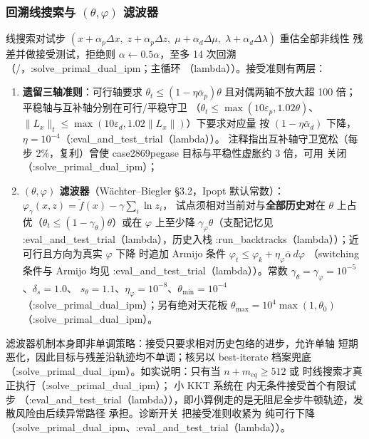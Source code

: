 \subsubsection*{回溯线搜索与 $(\theta,\varphi)$ 滤波器}
线搜索对试步 $(x+\alpha_p\Delta x,\;z+\alpha_p\Delta z,\;
\mu+\alpha_d\Delta\mu,\;\lambda+\alpha_d\Delta\lambda)$ 重估全部非线性
残差并做接受测试，拒绝则 $\alpha\leftarrow0.5\alpha$，至多 14 次回溯
（/，:solve\_primal\_dual\_ipm；主循环
（lambda））。接受准则有两层：
\begin{enumerate}
  \item \textbf{遗留三轴准则}：可行轴要求
        $\theta_t\le(1-\eta\bar\alpha_p)\theta$ 且对偶两轴不放大超 100 倍；
        平稳轴与互补轴分别在可行/平稳守卫
        （$\theta_t\le\max(10\varepsilon_p,1.02\theta)$、
        $\|L_x\|_t\le\max(10\varepsilon_d,1.02\|L_x\|)$）下要求对应量
        按 $(1-\eta\bar\alpha_d)$ 下降，$\eta=10^{-4}$（:eval\_and\_test\_trial（lambda））。
        注释指出互补轴守卫宽松（每步 2\%，复利）曾使 case2869pegase
        目标与平稳性虚胀约 3 倍，可用 
        关闭（:solve\_primal\_dual\_ipm）；
  \item \textbf{$(\theta,\varphi)$ 滤波器}（Wächter--Biegler §3.2，Ipopt
        默认常数）：$\varphi_\gamma(x,z)=\tilde f(x)-\gamma\sum_i\ln z_i$，
        试点须相对当前对与\textbf{全部历史对}在
        $\theta$ 上占优（$\theta_t\le(1-\gamma_\theta)\theta$）或在
        $\varphi$ 上至少降 $\gamma_\varphi\theta$（支配记忆见
        :eval\_and\_test\_trial（lambda），历史入栈 :run\_backtracks（lambda））；近可行且方向为真实 $\varphi$ 下降
        时追加 Armijo 条件
        $\varphi_t\le\varphi_k+\eta_\varphi\bar\alpha\, d\varphi$
        （switching 条件与 Armijo 均见 :eval\_and\_test\_trial（lambda））。常数
        $\gamma_\theta=\gamma_\varphi=10^{-5}$、$\delta_s=1.0$、
        $s_\theta=1.1$、$\eta_\varphi=10^{-8}$、$\theta_{\min}=10^{-4}$
        （:solve\_primal\_dual\_ipm）；另有绝对天花板
        $\theta_{\max}=10^{4}\max(1,\theta_0)$（:solve\_primal\_dual\_ipm）。
\end{enumerate}
滤波器机制本身即非单调策略：接受只要求相对历史包络的进步，允许单轴
短期恶化，因此目标与残差沿轨迹均不单调；核另以 best-iterate 档案兜底
（:solve\_primal\_dual\_ipm）。如实说明：只有当 $n+m_{eq}\ge512$ 或
 时线搜索才真正执行（:solve\_primal\_dual\_ipm）；
小 KKT 系统在  内无条件接受首个有限试步
（:eval\_and\_test\_trial（lambda）），即小算例走的是无阻尼全步牛顿轨迹，发散风险由后续异常路径
承担。诊断开关  把接受准则收紧为
纯可行下降（:solve\_primal\_dual\_ipm、:eval\_and\_test\_trial（lambda））。

